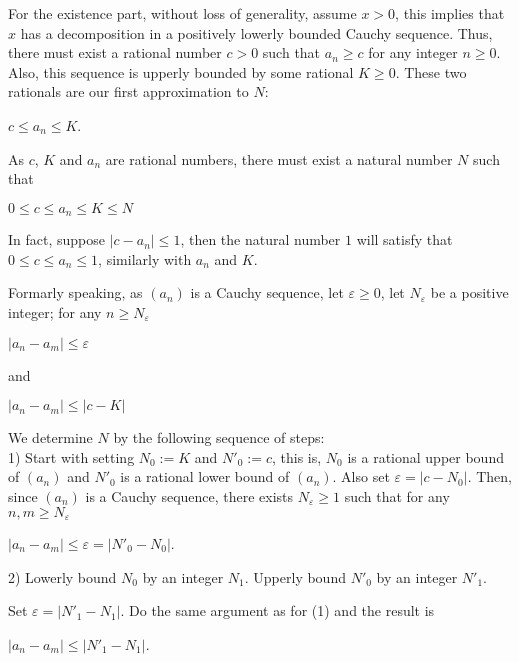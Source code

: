 \documentclass{article}
\theoremstyle{remark}
\begin{document}
\begin{enumerate}
        For the existence part, without loss of generality, assume $x > 0$,
        this implies that $x$ has a decomposition in a positively lowerly bounded Cauchy sequence.
        Thus, there must exist a rational number $c > 0$ such that $a_n \geq c$ for any integer $n \geq 0$.
        Also, this sequence is upperly bounded by some rational $K \geq 0$.
        These two rationals are our first approximation to $N$:
        \begin{center}
            $c\leq a_n \leq K$.
        \end{center}
        As $c$, $K$ and $a_n$ are rational numbers, there must exist a natural number $N$ such that 
        \begin{center}
            $0 \leq c\leq a_n \leq K \leq N$
        \end{center}
        In fact, suppose $\vert c - a_n \vert \leq 1$, then the natural number $1$ will satisfy that
        $0\leq c \leq a_n \leq 1$, similarly with $a_n$ and $K$.
        
        Formarly speaking, as $(a_n)$ is a Cauchy sequence, let $\varepsilon \geq 0$,
        let $N_{\varepsilon}$ be a positive integer; for any $n \geq N_{\varepsilon}$
        \begin{center}
            $\vert a_n - a_m \vert \leq \varepsilon$
        \end{center}
        and 
        \begin{center}
            $\vert a_n - a_m \vert \leq \vert c - K \vert$
        \end{center}
        We determine $N$ by the following sequence of steps:\\
        1) Start with setting $N_0:=K$ and $N'_0 := c$,
        this is, $N_0$ is a rational upper bound of $(a_n)$ and $N'_0$ is a rational lower bound of $(a_n)$.
        Also set $\varepsilon = \vert c - N_0 \vert$. Then, since $(a_n)$ is a Cauchy sequence, there exists
        $N_{\varepsilon} \geq 1$ such that for any $n, m \geq N_{\varepsilon}$
        \begin{center}
            $\vert a_n - a_m \vert \leq \varepsilon = \vert N'_0 - N_0 \vert$.
        \end{center}
        2) Lowerly bound $N_0$ by an integer $N_1$. 
        Upperly bound $N'_0$ by an integer $N'_1$. 
        
        Set $\varepsilon = \vert N'_1 - N_1 \vert$.
        Do the same argument as for (1) and the result is 
        \begin{center}
            $\vert a_n - a_m \vert \leq \vert N'_1 - N_1\vert$.
        \end{center}


\end{enumerate}
\end{document}
